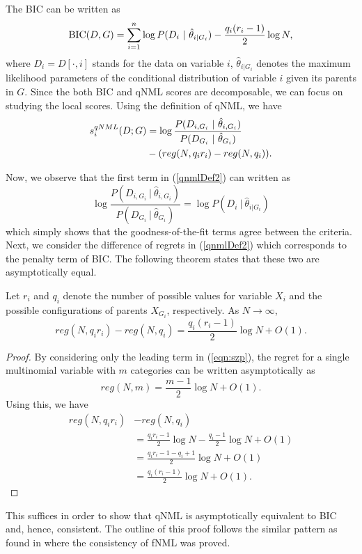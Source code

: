 The BIC can be written as
\begin{equation}
\textnormal{BIC}(D,G) = \sum_{i = 1}^n \log P(D_i \ | \ \hat{\theta}_{i | G_i} ) - \frac{q_i(r_i - 1)}{2} \log N,
\end{equation}where $D_i = D[\cdot, i]$ stands for the data on variable $i$, $\hat{\theta}_{i | G_i}$ denotes the maximum likelihood parameters of the conditional distribution of variable $i$ given its parents in $G$. Since the both BIC and qNML scores are decomposable, we can focus on studying the local scores. Using the definition of qNML, we have
\begin{align}\label{qnmlDef2}
s^{qNML}_i(D;G) &= \log \frac{P(D_{i, G_i} \ | \ \hat{\theta}_{i, G_i} )}{P(D_{G_i} \ | \ \hat{\theta}_{G_i} )} \notag \\
& -(reg(N,q_i r_i) - reg(N,q_i)).
\end{align}

Now, we observe that the first term in (\ref{qnmlDef2}) can written as
$$
\log \frac{P(D_{i, G_i} \ | \ \hat{\theta}_{i, G_i} )}{P(D_{G_i} \ | \ \hat{\theta}_{G_i} )} = \log P(D_i \ | \ \hat{\theta}_{i | G_i} )
$$ which simply shows that the goodness-of-the-fit terms agree between the criteria. Next, we consider the difference of regrets in (\ref{qnmlDef2}) which corresponds to the penalty term of BIC. The following theorem states that these two are asymptotically equal.

\begin{theorem}
Let $r_i$ and $q_i$ denote the number of possible values for variable $X_i$ and the possible configurations of parents $X_{G_i}$, respectively. As $N \to \infty$,
$$reg(N,q_i r_i) - reg(N,q_i) = \frac{q_i(r_i - 1)}{2}\log N + O(1).$$
\end{theorem}   
\begin{proof}
By considering only the leading term in (\ref{eqn:szp}), the regret for a single multinomial variable with $m$ categories can be written asymptotically as
$$
reg(N,m) = \frac{m-1}{2}\log N + O(1).
$$ Using this, we have
\begin{align*}
reg(N,q_i r_i)& -  reg(N,q_i) \\ 
&= \frac{q_ir_i-1}{2}\log N-\frac{q_i-1}{2}\log N + O(1) \\
&= \frac{q_ir_i-1-q_i + 1}{2}\log N + O(1) \\
&= \frac{q_i(r_i - 1)}{2} \log N + O(1).
\end{align*}
\end{proof}
This suffices in order to show that qNML is asymptotically equivalent to BIC and, hence, consistent. The outline of this proof follows the similar pattern as found in \cite{SilanderIJAR10} where the consistency of fNML was proved.

